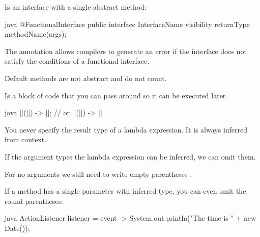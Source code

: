 \begin{defnbox}\nospacing
  \begin{defn}\label{defn:functionalInterface}
    Is an interface with a single abstract method:
    \begin{mintlinebox}{java}
      @FunctionalInterface
      public interface InterfaceName{
        visibility returnType methodName(args);
      }
    \end{mintlinebox}
  \end{defn}
\end{defnbox}
\begin{notebox}[Notes]\nospacing
  \begin{itemizenosep}
      \item The annotation  allows compilers to generate an
  error if the interface does not satisfy the conditions of a functional
  interface.
    \item Default methods are not abstract and do not count.
  \end{itemizenosep}
\end{notebox}
\begin{defnbox}\nospacing
  \begin{defn}
    Is a block of code that you can pass around so it can be executed later.
    \begin{mintlinebox}{java}
      ||(||) -> ||;
      // or
      ||(||) -> ||
    \end{mintlinebox}
    You never specify the result type of a lambda expression. It is always
    inferred from context.
  \end{defn}
\end{defnbox}
\begin{notebox}[Note]\nospacing
  \begin{itemizenosep}
      \item If the argument types the lambda expression can be inferred, we can
    omit them.
      \item For no arguments we still need to write empty parentheses
    \javainline{()}.
      \item If a method has a single parameter with inferred type, you can even
    omit the round parentheses:\\
    \begin{mintlinebox}{java}
    ActionListener listener = event ->
    System.out.println("The time is " + new Date());
    \end{mintlinebox}
  \end{itemizenosep}
\end{notebox}
